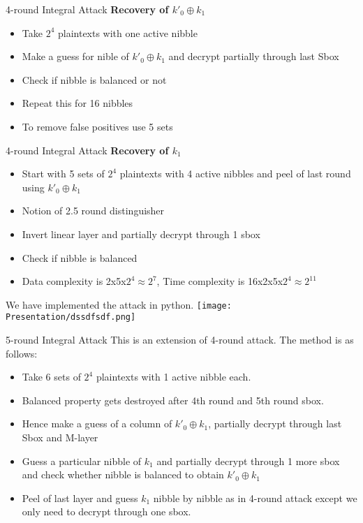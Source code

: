 \begin{frame}{4-round Integral Attack} 
\textbf{Recovery of $k'_0\oplus k_1$}
\begin{itemize}
    \item Take $2^4$ plaintexts with one active nibble
    \item Make a guess for nible of $k'_0 \oplus k_1$ and decrypt partially through last Sbox
    \item Check if nibble is balanced or not
    \item Repeat this for 16 nibbles
    \item To remove false positives use 5 sets
\end{itemize}

\end{frame}
\begin{frame}{4-round Integral Attack}
\textbf{Recovery of $k_1$}
\begin{itemize}
    \item Start with 5 sets of $2^4$ plaintexts with 4 active nibbles and peel of last round using $k'_0\oplus k_1$
    \item Notion of 2.5 round distinguisher
    \item Invert linear layer and partially decrypt through 1 sbox
    \item Check if nibble is balanced
    \item Data complexity is 2x5x$2^4 \approx 2^7$, Time complexity is 16x2x5x$2^4 \approx 2^{11}$
\end{itemize}
We have implemented the attack in python.
\texttt{[image: Presentation/dssdfsdf.png]}
\end{frame}
\begin{frame}{5-round Integral Attack}
    This is an extension of 4-round attack. The method is as follows:
    \begin{itemize}
        \item Take 6 sets of $2^4$ plaintexts with 1 active nibble each.
        \item Balanced property gets destroyed after 4th round and 5th round sbox.
        \item Hence make a guess of a column of $k'_0 \oplus k_1$, partially decrypt through last Sbox and M-layer
        \item Guess a particular nibble of $k_1$ and partially decrypt through 1 more sbox and check whether nibble is balanced to obtain $k'_0 \oplus k_1$
        \item Peel of last layer and guess $k_1$ nibble by nibble as in 4-round attack except we only need to decrypt through one sbox.
    \end{itemize}
\end{frame}